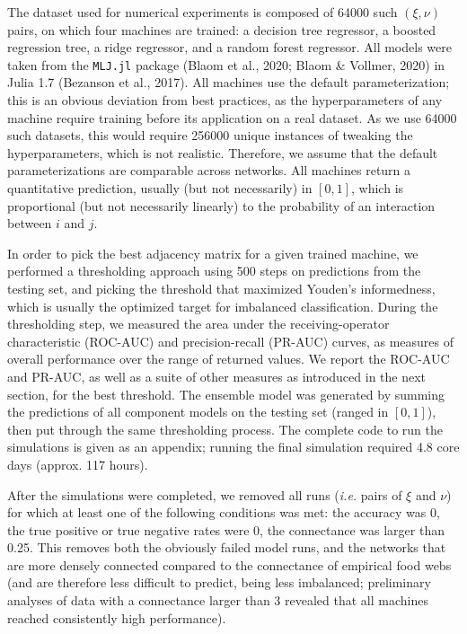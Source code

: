 \documentclass[11pt]{article}
\begin{document}
The dataset used for numerical experiments is composed of 64000 such
\((\xi, \nu)\) pairs, on which four machines are trained: a decision
tree regressor, a boosted regression tree, a ridge regressor, and a
random forest regressor. All models were taken from the \texttt{MLJ.jl}
package (Blaom et al., 2020; Blaom \& Vollmer, 2020) in Julia 1.7
(Bezanson et al., 2017). All machines use the default parameterization;
this is an obvious deviation from best practices, as the hyperparameters
of any machine require training before its application on a real
dataset. As we use 64000 such datasets, this would require 256000 unique
instances of tweaking the hyperparameters, which is not realistic.
Therefore, we assume that the default parameterizations are comparable
across networks. All machines return a quantitative prediction, usually
(but not necessarily) in \([0,1]\), which is proportional (but not
necessarily linearly) to the probability of an interaction between \(i\)
and \(j\).

In order to pick the best adjacency matrix for a given trained machine,
we performed a thresholding approach using 500 steps on predictions from
the testing set, and picking the threshold that maximized Youden's
informedness, which is usually the optimized target for imbalanced
classification. During the thresholding step, we measured the area under
the receiving-operator characteristic (ROC-AUC) and precision-recall
(PR-AUC) curves, as measures of overall performance over the range of
returned values. We report the ROC-AUC and PR-AUC, as well as a suite of
other measures as introduced in the next section, for the best
threshold. The ensemble model was generated by summing the predictions
of all component models on the testing set (ranged in \([0,1]\)), then
put through the same thresholding process. The complete code to run the
simulations is given as an appendix; running the final simulation
required 4.8 core days (approx. 117 hours).

After the simulations were completed, we removed all runs (\emph{i.e.}
pairs of \(\xi\) and \(\nu\)) for which at least one of the following
conditions was met: the accuracy was 0, the true positive or true
negative rates were 0, the connectance was larger than 0.25. This
removes both the obviously failed model runs, and the networks that are
more densely connected compared to the connectance of empirical food
webs (and are therefore less difficult to predict, being less
imbalanced; preliminary analyses of data with a connectance larger than
3 revealed that all machines reached consistently high performance).
\end{document}
